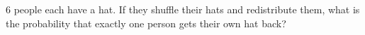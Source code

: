$6$ people each have a hat.  If they shuffle their hats and redistribute them, what is the probability that exactly one person gets their own hat back?